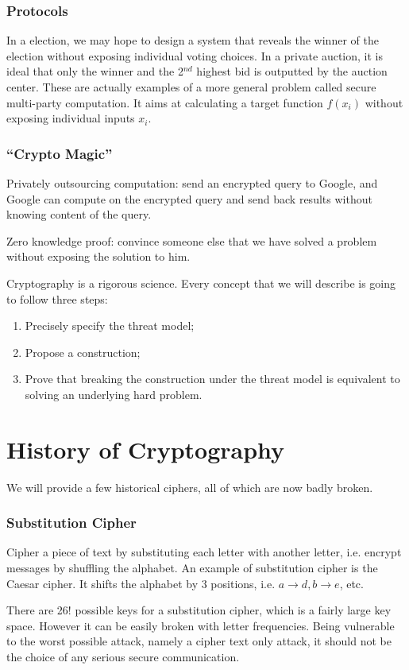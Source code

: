 \subsubsection{Protocols}
In a election, we may hope to design a system that reveals the winner of the election without exposing individual voting choices. In a private auction, it is ideal that only the winner and the 2$^{nd}$ highest bid is outputted by the auction center. These are actually examples of a more general problem called secure multi-party computation. It aims at calculating a target function $f(x_i)$ without exposing individual inputs $x_i$.
\subsubsection{``Crypto Magic''}
Privately outsourcing computation: send an encrypted query to Google, and Google can compute on the encrypted query and send back results without knowing content of the query.

Zero knowledge proof: convince someone else that we have solved a problem without exposing the solution to him. 

Cryptography is a rigorous science. Every concept that we will describe is going to follow three steps: 
\begin{enumerate}
\item Precisely specify the threat model;
\item Propose a construction;
\item Prove that breaking the construction under the threat model is equivalent to solving an underlying hard problem.
\end{enumerate}
\section{History of Cryptography}
We will provide a few historical ciphers, all of which are now badly broken. 
\subsubsection{Substitution Cipher}
Cipher a piece of text by substituting each letter with another letter, i.e. encrypt messages by shuffling the alphabet. An example of substitution cipher is the Caesar cipher. It shifts the alphabet by 3 positions, i.e. $a\rightarrow d, b\rightarrow e$, etc. 

There are 26! possible keys for a substitution cipher, which is a fairly large key space. However it can be easily broken with letter frequencies. Being vulnerable to the worst possible attack, namely a cipher text only attack, it should not be the choice of any serious secure communication.

